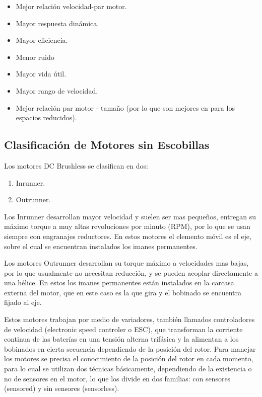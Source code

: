 \begin{itemize}
\item Mejor relación velocidad-par motor.
\item Mayor respuesta dinámica.
\item Mayor eficiencia.
\item Menor ruido
\item Mayor vida útil.
\item Mayor rango de velocidad.
\item Mejor relación par motor - tamaño (por lo que son mejores en para los espacios reducidos).
\end{itemize}


\subsection{Clasificación de Motores sin Escobillas}
\label{clasificacion_motores}

Los motores DC Brushless se clasifican en dos: 

\begin{enumerate}
\item Inrunner.
\item Outrunner.
\end{enumerate}

Los Inrunner desarrollan mayor velocidad y suelen ser mas pequeños, entregan su máximo torque a muy altas revoluciones por minuto (RPM), por lo que se usan siempre con engranajes reductores. En estos motores el elemento móvil es el eje, sobre el cual se encuentran instalados los imanes permanentes.

Los motores Outrunner desarrollan su torque máximo a velocidades mas bajas, por lo que usualmente no necesitan reducción, y se pueden acoplar directamente a una hélice. En estos los imanes permanentes están instalados en la carcasa externa del motor, que en este caso es la que gira y el bobinado se encuentra fijado al eje.

Estos motores trabajan por medio de variadores, también llamados controladores de velocidad (electronic speed controler o ESC), que transforman la corriente continua de las baterías en una tensión alterna trifásica y la alimentan a los bobinados en cierta secuencia dependiendo de la posición del rotor.
Para manejar los motores se precisa el conocimiento de la posición del rotor en cada momento, para lo cual se utilizan dos técnicas básicamente, dependiendo de la existencia o no de sensores en el motor, lo que los divide en dos familias: con sensores (sensored) y sin sensores (sensorless).

